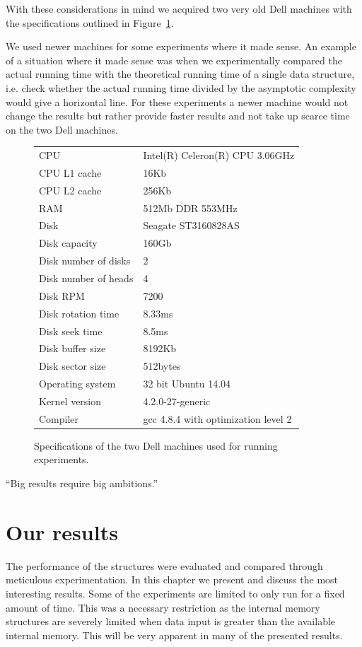 \documentclass[twoside,11pt,openright]{report}
\begin{document}
With these considerations in mind we acquired two very old Dell machines with the specifications outlined in Figure~\ref{fig:pc_specs}.

We used newer machines for some experiments where it made sense. An example of a situation where it made sense was when we experimentally compared the actual running time with the theoretical running time of a single data structure, i.e. check whether the actual running time divided by the asymptotic complexity would give a horizontal line. For these experiments a newer machine would not change the results but rather provide faster results and not take up scarce time on the two Dell machines.

\begin{figure}[h]
\centering
\begin{tabular}{ll}
CPU & Intel(R) Celeron(R) CPU 3.06GHz \\
CPU L1 cache & 16Kb \\
CPU L2 cache & 256Kb \\
RAM & 512Mb DDR 553MHz \\
Disk & Seagate ST3160828AS \\
Disk capacity & 160Gb \\
Disk number of disks & 2 \\
Disk number of heads & 4 \\
Disk RPM & 7200 \\
Disk rotation time & 8.33ms \\
Disk seek time & 8.5ms \\
Disk buffer size & 8192Kb \\
Disk sector size & 512bytes \\
Operating system & 32 bit Ubuntu 14.04 \\
Kernel version & 4.2.0-27-generic \\
Compiler & gcc 4.8.4 with optimization level 2
\end{tabular}
\caption{Specifications of the two Dell machines used for running experiments.}
\label{fig:pc_specs}
\end{figure}

\begin{savequote}[0.4\textwidth]
``Big results require big ambitions.''
\end{savequote}
\chapter{Our results}
\label{chp:experimental_results}
The performance of the structures were evaluated and compared through meticulous experimentation. In this chapter we present and discuss the most interesting results. Some of the experiments are limited to only run for a fixed amount of time. This was a necessary restriction as the internal memory structures are severely limited when data input is greater than the available internal memory. This will be very apparent in many of the presented results.
\end{document}
